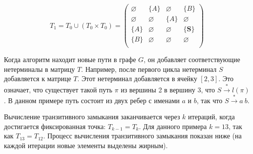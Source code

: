\begin{example}
\[
T_1 = T_0 \cup (T_0 \times T_0) = \begin{pmatrix}
    \varnothing & \{A\}       & \varnothing & \{B\}       \\
    \varnothing & \varnothing & \{A\}       & \varnothing \\
    \{A\}       & \varnothing & \varnothing & \{\pmb{S}\}       \\
    \{B\}       & \varnothing & \varnothing & \varnothing \\
\end{pmatrix}
\]

Когда алгоритм находит новые пути в графе $G$, он добавляет соответствующие нетерминалы в матрицу $T$. Например, после первого цикла нетерминал $S$ добавляется к матрице $T$. Этот нетерминал добавляется в ячейку $[2,3]$. Это означает, что существует такой путь $\pi$ из вершины 2 в вершину 3, что $S \xrightarrow{*} l(\pi)$. В данном примере путь состоит из двух ребер с именами $a$ и $b$, так что $S \xrightarrow{*} a \ b$.

Вычисление транзитивного замыкания заканчивается через $k$ итераций, когда достигается фиксированная точка: $T_{k-1} = T_k$. Для данного примера $k = 13$, так как $T_{13} = T_{12}$. Процесс вычисления транзитивного замыкания показан ниже (на каждой итерации новые элементы выделены жирным).



\end{example}
